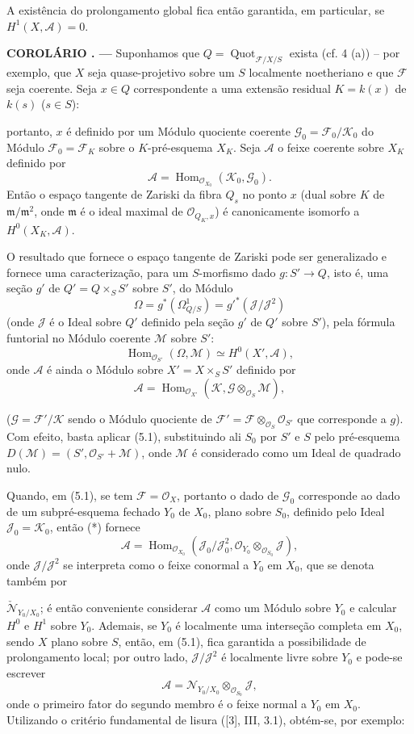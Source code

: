 \documentclass[11pt,twoside,openany]{book}
\numberwithin{equation}{section}
\newcommand{\src}[1]{%
  \phantomsection\hypertarget{src:#1}{}%
  \marginpar{\raggedleft\footnotesize\sffamily #1}%
}
\theoremstyle{plain}
\theoremstyle{definition}
\theoremstyle{remark}
\newcommand{\result}[2]{%
  \par\medskip\noindent\textbf{#1%
  \if\relax\detokenize{#2}\relax\else\space#2\fi. ---}\enspace
}
\newcommand{\FgaUnitKey}{frontmatter}
\renewcommand{\src}[1]{%
  \phantomsection\hypertarget{src:\FgaUnitKey:#1}{}%
  \marginpar{\raggedleft\footnotesize\sffamily #1}%
}
\begin{document}
A existência do prolongamento global fica então garantida, em particular, se
$H^1(X,\mathcal A)=0$.

\result{COROLÁRIO}{5.3} Suponhamos que
$Q=\operatorname{Quot}_{\mathcal F/X/S}$ exista (cf. 4 (a)) -- por exemplo,
que $X$ seja quase-projetivo sobre um $S$ localmente noetheriano e que
$\mathcal F$ seja coerente. Seja $x\in Q$ correspondente a uma extensão
residual $K=k(x)$ de $k(s)$ ($s\in S$):
\src{270}
portanto, $x$ é definido por um Módulo quociente coerente
$\mathcal G_0=\mathcal F_0/\mathcal K_0$ do Módulo
$\mathcal F_0=\mathcal F_K$ sobre o $K$-pré-esquema $X_K$. Seja $\mathcal A$
o feixe coerente sobre $X_K$ definido por
\[
\mathcal A=\operatorname{Hom}_{\mathcal O_{X_0}}(\mathcal K_0,\mathcal G_0).
\]
Então o espaço tangente de Zariski da fibra $Q_s$ no ponto $x$ (dual sobre
$K$ de $\mathfrak m/\mathfrak m^2$, onde $\mathfrak m$ é o ideal maximal de
$\mathcal O_{Q_K,x}$) é canonicamente isomorfo a $H^0(X_K,\mathcal A)$.

O resultado que fornece o espaço tangente de Zariski pode ser generalizado e
fornece uma caracterização, para um $S$-morfismo dado
$g:S'\longrightarrow Q$, isto é, uma seção $g'$ de $Q'=Q\times_SS'$ sobre
$S'$, do Módulo
\[
\Omega=g^*(\Omega^1_{Q/S})=g'^*(\mathcal J/\mathcal J^2)
\]
(onde $\mathcal J$ é o Ideal sobre $Q'$ definido pela seção $g'$ de $Q'$ sobre
$S'$), pela fórmula funtorial no Módulo coerente $\mathcal M$ sobre $S'$:
\[
\operatorname{Hom}_{\mathcal O_{S'}}(\Omega,\mathcal M)
\simeq H^0(X',\mathcal A),
\]
onde $\mathcal A$ é ainda o Módulo sobre $X'=X\times_SS'$ definido por
\[
\mathcal A=\operatorname{Hom}_{\mathcal O_{X'}}
(\mathcal K,\mathcal G\otimes_{\mathcal O_S}\mathcal M),
\]

($\mathcal G=\mathcal F'/\mathcal K$ sendo o Módulo quociente de
$\mathcal F'=\mathcal F\otimes_{\mathcal O_S}\mathcal O_{S'}$ que corresponde
a $g$). Com efeito, basta aplicar (5.1), substituindo ali $S_0$ por $S'$ e $S$
pelo pré-esquema $D(\mathcal M)=(S',\mathcal O_{S'}+\mathcal M)$, onde
$\mathcal M$ é considerado como um Ideal de quadrado nulo.

Quando, em (5.1), se tem $\mathcal F=\mathcal O_X$, portanto o dado de
$\mathcal G_0$ corresponde ao dado de um subpré-esquema fechado $Y_0$ de
$X_0$, plano sobre $S_0$, definido pelo Ideal
$\mathcal J_0=\mathcal K_0$, então (*) fornece
\[
\mathcal A=\operatorname{Hom}_{\mathcal O_{X_0}}
(\mathcal J_0/\mathcal J_0^2,
\mathcal O_{Y_0}\otimes_{\mathcal O_{S_0}}\mathcal J),
\]
onde $\mathcal J/\mathcal J^2$ se interpreta como o feixe conormal a $Y_0$ em
$X_0$, que se denota também por
\src{271}
$\check{\mathcal N}_{Y_0/X_0}$; é então conveniente considerar $\mathcal A$
como um Módulo sobre $Y_0$ e calcular $H^0$ e $H^1$ sobre $Y_0$. Ademais, se
$Y_0$ é localmente uma interseção completa em $X_0$, sendo $X$ plano sobre
$S$, então, em (5.1), fica garantida a possibilidade de prolongamento local;
por outro lado, $\mathcal J/\mathcal J^2$ é localmente livre sobre $Y_0$ e
pode-se escrever
\[
\mathcal A=\mathcal N_{Y_0/X_0}\otimes_{\mathcal O_{S_0}}\mathcal J,
\]
onde o primeiro fator do segundo membro é o feixe normal a $Y_0$ em $X_0$.
Utilizando o critério fundamental de lisura ([3], III, 3.1), obtém-se, por
exemplo:
\end{document}
